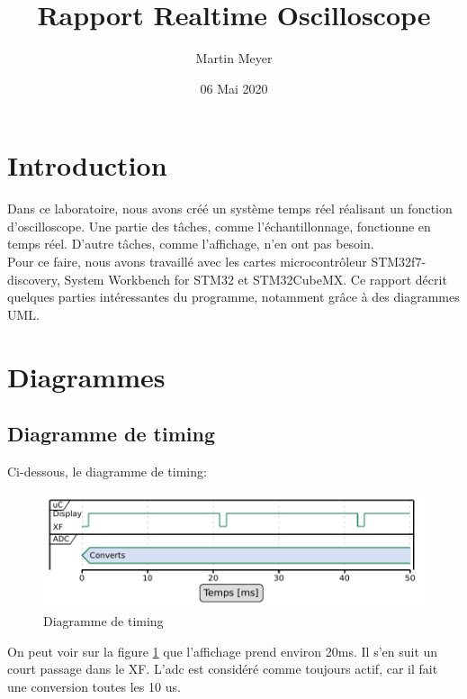 \documentclass[12pt]{article}
\title{Rapport Realtime Oscilloscope}
\author{Martin Meyer}
\date{06 Mai 2020}
\begin{document}
	\maketitle
	
	\tableofcontents

	\section{Introduction}
	Dans ce laboratoire, nous avons créé un système temps réel réalisant un fonction d'oscilloscope. Une partie des tâches, comme l'échantillonnage, fonctionne en temps réel. D'autre tâches, comme l'affichage, n'en ont pas besoin.\\
	Pour ce faire, nous avons travaillé avec les cartes microcontrôleur STM32f7-discovery, System Workbench for STM32 et STM32CubeMX.\newline
	Ce rapport décrit quelques parties intéressantes du programme, notamment grâce à des diagrammes UML.\newpage
	\section{Diagrammes}
	\subsection{Diagramme de timing}
	Ci-dessous, le diagramme de timing:
	\begin{figure}[H]
		\begin{center}
			\includegraphics[width=\columnwidth]{Ressources/timing.pdf}
			\caption{\label{timing} Diagramme de timing}
		\end{center}
	\end{figure}
	On peut voir sur la figure \ref{timing} que l'affichage prend environ 20ms. Il s'en suit un court passage dans le XF. L'adc est considéré comme toujours actif, car il fait une conversion toutes les 10 us.
\end{document}
